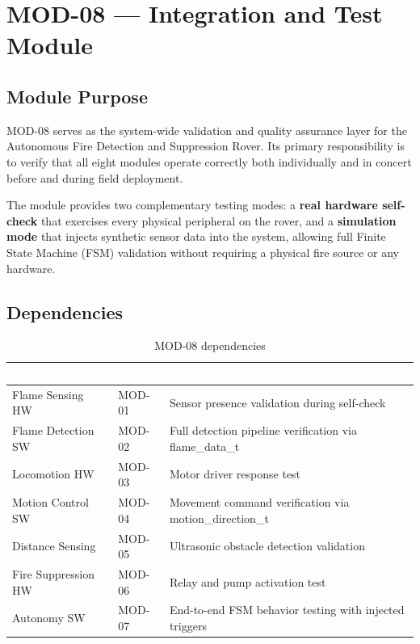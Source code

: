 \documentclass[12pt,a4paper]{article}
\newcommand{\theadtext}[1]{\textcolor{white}{\textbf{#1}}}
\newcommand{\fn}[1]{{\footnotesize\ttfamily #1}}
\begin{document}
\newpage

\section{MOD-08 --- Integration and Test Module}

\subsection{Module Purpose}

MOD-08 serves as the system-wide validation and quality assurance layer for the
Autonomous Fire Detection and Suppression Rover. Its primary responsibility is to
verify that all eight modules operate correctly both individually and in concert
before and during field deployment.

The module provides two complementary testing modes: a \textbf{real hardware
self-check} that exercises every physical peripheral on the rover, and a
\textbf{simulation mode} that injects synthetic sensor data into the system,
allowing full Finite State Machine (FSM) validation without requiring a physical
fire source or any hardware.

\subsection{Dependencies}

\begin{table}[H]
\centering\small
\begin{tabularx}{\textwidth}{L{4.5cm} L{2.5cm} X}
\toprule
{}
\theadtext{Module Name} & \theadtext{ID} & \theadtext{Usage in MOD-08} \\
\midrule
{}   Flame Sensing HW    & \fn{MOD-01} & Sensor presence validation during self-check \\
 Flame Detection SW  & \fn{MOD-02} & Full detection pipeline verification via \fn{flame\_data\_t} \\
   Locomotion HW       & \fn{MOD-03} & Motor driver response test \\
 Motion Control SW   & \fn{MOD-04} & Movement command verification via \fn{motion\_direction\_t} \\
   Distance Sensing    & \fn{MOD-05} & Ultrasonic obstacle detection validation \\
 Fire Suppression HW & \fn{MOD-06} & Relay and pump activation test \\
   Autonomy SW         & \fn{MOD-07} & End-to-end FSM behavior testing with injected triggers \\
\bottomrule
\end{tabularx}
\caption{MOD-08 dependencies}
\end{table}
\end{document}

